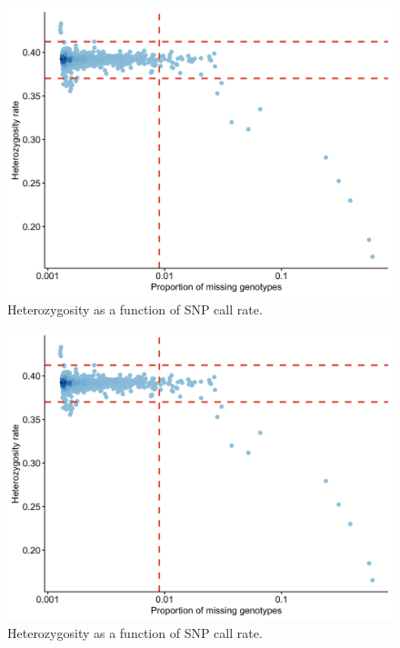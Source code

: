 \documentclass[
]{book}
\begin{document}
\begin{figure}

{\centering \includegraphics[width=18.67in]{img/show-heterozygosity} 

}

\caption{Heterozygosity as a function of SNP call rate.}\label{fig:show-heterozygosity}
\end{figure}
\begin{figure}

{\centering \includegraphics[width=18.67in]{img/_gwas/show-heterozygosity} 

}

\caption{Heterozygosity as a function of SNP call rate.}\label{fig:show-heterozygosity}
\end{figure}
\end{document}
